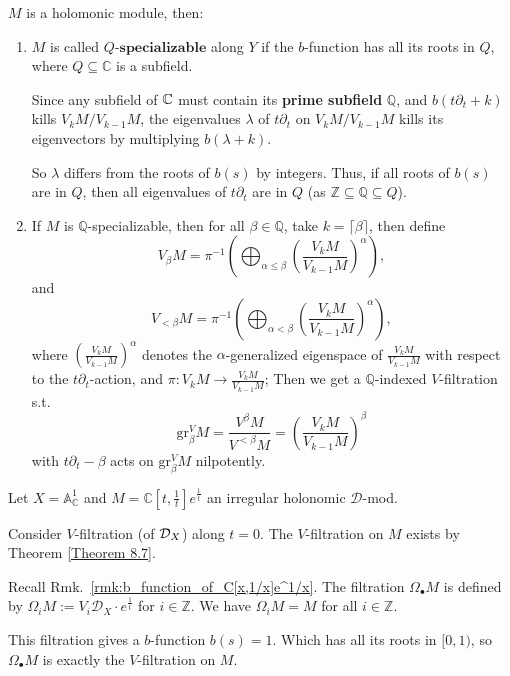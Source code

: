 \begin{definition}
    $M$ is a holomonic module, then:

    \begin{enumerate}
        \item  $M$ is called $Q\textbf{-specializable}$ along $Y$ if the $b$-function has all its roots in $Q$, where $Q \subseteq \mathbb{C}$ is a subfield.

              Since any subfield of $\mathbb{C}$ must contain its \textbf{prime subfield} $\mathbb{Q}$, and $b(t\partial_t + k)$ kills $V_kM/V_{k-1}M$,
              the eigenvalues $\lambda$ of $t\partial_t$ on $V_kM/V_{k-1}M$ kills its eigenvectors by multiplying $b(\lambda + k)$.

              So $\lambda$ differs from the roots of $b(s)$ by integers.
              Thus, if all roots of $b(s)$ are in $Q$, then all eigenvalues of $t\partial_t$ are in $Q$ (as $\mathbb{Z} \subseteq \mathbb{Q} \subseteq Q$).

        \item If $M$ is $\mathbb{Q}$-specializable,
              then for all $\beta \in \mathbb{Q}$,
              take $k = \lceil \beta \rceil$,
              then define
              $$V_{\beta} M = \pi^{-1} \left( \bigoplus_{\alpha \leq \beta} \left( \frac{V_k M}{V_{k-1} M} \right)^{\alpha} \right),$$
              and
              $$V_{<\beta} M = \pi^{-1} \left( \bigoplus_{\alpha < \beta} \left( \frac{V_k M}{V_{k-1} M} \right)^{\alpha} \right),$$
              where $\left( \frac{V_k M}{V_{k-1} M} \right)^{\alpha}$ denotes the $\alpha$-generalized eigenspace of $\frac{V_k M}{V_{k-1} M}$
              with respect to the $t\partial_t$-action, and $\pi: V_k M \rightarrow \frac{V_k M}{V_{k-1} M}$;
              Then we get a $\mathbb{Q}$-indexed $V$-filtration s.t.
              $$\mathrm{gr}_{\beta}^{V} M = \frac{V^{\beta} M}{V^{<\beta} M} = \left( \frac{V_k M}{V_{k-1} M} \right)^{\beta}$$
              with $t\partial_t - \beta$ acts on $\mathrm{gr}_{\beta}^{V} M$ nilpotently.
    \end{enumerate}
\end{definition}
\begin{example}
    Let $X=\mathbb{A}^{1}_{\mathbb{C}}$ and $M = \mathbb{C}\left[ t, \frac{1}{t} \right]e^{\frac{1}{t}}$ an irregular holonomic $\mathcal{D}$-mod.

    Consider $V$-filtration (of $\mathcal{D}_X$) along $t = 0$. The $V$-filtration on $M$ exists by Theorem \ref{Theorem 8.7}.

    Recall Rmk.~\ref{rmk:b_function_of_C[x,1/x]e^1/x}. The filtration $\Omega_\bullet M$ is defined by $\Omega_i M := V_i \mathcal{D}_{X} \cdot e^{\frac{1}{t}}$ for $i \in \mathbb{Z}$.
    We have $\Omega_i M = M$ for all $i\in \mathbb{Z}$.

    This filtration gives a $b$-function $b(s) = 1$. Which has all its roots in $[0,1)$, so $\Omega_\bullet M$ is exactly the $V$-filtration on $M$.
\end{example}

